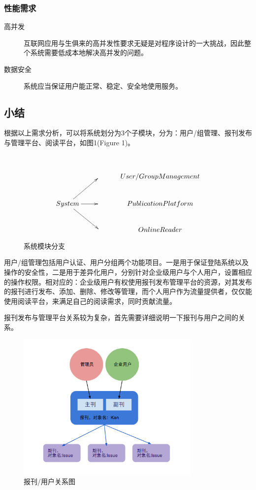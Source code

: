 \subsubsection{性能需求}
\begin{description}
	\item[高并发] 互联网应用与生俱来的高并发性要求无疑是对程序设计的一大挑战，因此整个系统需要低成本地解决高并发的问题。
	\item[数据安全] 系统应当保证用户能正常、稳定、安全地使用服务。
\end{description}

\subsection{小结}
根据以上需求分析，可以将系统划分为3个子模块，分为：用户/组管理、报刊发布与管理平台、阅读平台，如图1(Figure 1)。
\par~

\begin{figure}[h]
\begin{displaymath}
	\xymatrix{
	  			 && User/Group Management \\
	  System \ar[ur] \ar[r] \ar[dr] && Publication Platform \\
	  			 && Online Reader }
\end{displaymath}
\caption{系统模块分支}
\end{figure}

用户/组管理包括用户认证、用户分组两个功能项目。一是用于保证登陆系统以及操作的安全性，二是用于差异化用户，分别针对企业级用户与个人用户，设置相应的操作权限。相对应的：企业级用户有权使用报刊发布管理平台的资源，对其发布的报刊进行发布、添加、删除、修改等管理，而个人用户作为流量提供者，仅仅能使用阅读平台，来满足自己的阅读需求，同时贡献流量。
\par

报刊发布与管理平台关系较为复杂，首先需要详细说明一下报刊与用户之间的关系。 \clearpage

\begin{figure}[t]
	\centering
		\includegraphics[width=0.8\textwidth]{./images/chap1-1.png}
	\caption{报刊/用户关系图}
\end{figure}

